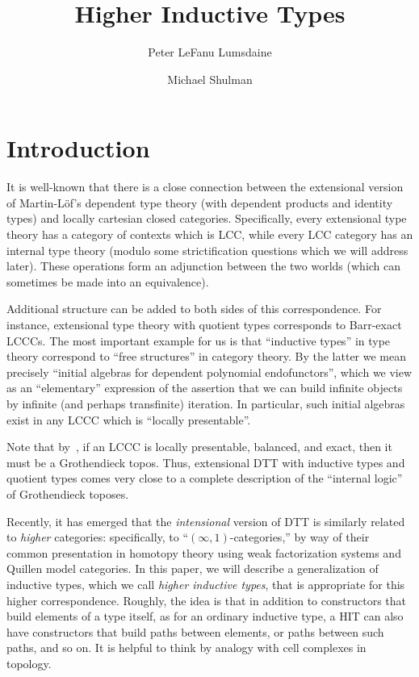 \documentclass{amsart}
\title{Higher Inductive Types}
\author{Peter LeFanu Lumsdaine}
\author{Michael Shulman}
\begin{document}
\maketitle

\tableofcontents

\section{Introduction}
\label{sec:intro}

It is well-known that there is a close connection between the extensional version of Martin-L\"of's dependent type theory (with dependent products and identity types) and locally cartesian closed categories.
Specifically, every extensional type theory has a category of contexts which is LCC, while every LCC category has an internal type theory (modulo some strictification questions which we will address later).
These operations form an adjunction between the two worlds (which can sometimes be made into an equivalence).

Additional structure can be added to both sides of this correspondence.
For instance, extensional type theory with quotient types corresponds to Barr-exact LCCCs.
The most important example for us is that ``inductive types'' in type theory correspond to ``free structures'' in category theory.
By the latter we mean precisely ``initial algebras for dependent polynomial endofunctors'', which we view as an ``elementary'' expression of the assertion that we can build infinite objects by infinite (and perhaps transfinite) iteration.
In particular, such initial algebras exist in any LCCC which is ``locally presentable''.

Note that by~\cite[C2.2.8(ix)]{ptj:elephant}, if an LCCC is locally presentable, balanced, and exact, then it must be a Grothendieck topos.
Thus, extensional DTT with inductive types and quotient types comes very close to a complete description of the ``internal logic'' of Grothendieck toposes.

Recently, it has emerged that the \emph{intensional} version of DTT is similarly related to \emph{higher} categories: specifically, to ``$(\infty,1)$-categories,'' by way of their common presentation in homotopy theory using weak factorization systems and Quillen model categories.
In this paper, we will describe a generalization of inductive types, which we call \emph{higher inductive types}, that is appropriate for this higher correspondence.
Roughly, the idea is that in addition to constructors that build elements of a type itself, as for an ordinary inductive type, a HIT can also have constructors that build paths between elements, or paths between such paths, and so on.
It is helpful to think by analogy with cell complexes in topology.
\end{document}
